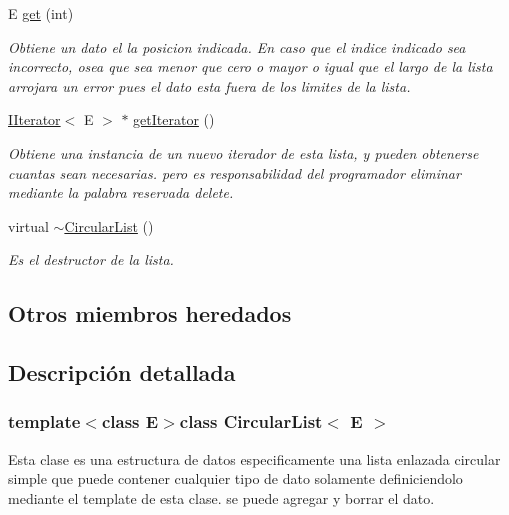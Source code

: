 \begin{DoxyCompactItemize}
E \hyperlink{classCircularList_ad6783339c7ff05841fc62f74f809644d}{get} (int)
\begin{DoxyCompactList}\small\item\em Obtiene un dato el la posicion indicada. En caso que el indice indicado sea incorrecto, osea que sea menor que cero o mayor o igual que el largo de la lista arrojara un error pues el dato esta fuera de los limites de la lista. \end{DoxyCompactList}\item 
\hyperlink{classIIterator}{I\-Iterator}$<$ E $>$ $\ast$ \hyperlink{classCircularList_a43e6cf1632001b3f409c6ce531529c6e}{get\-Iterator} ()
\begin{DoxyCompactList}\small\item\em Obtiene una instancia de un nuevo iterador de esta lista, y pueden obtenerse cuantas sean necesarias. pero es responsabilidad del programador eliminar mediante la palabra reservada delete. \end{DoxyCompactList}\item 
\hypertarget{classCircularList_aa65c9665b7d36a5e609752cad0a35dbb}{virtual \hyperlink{classCircularList_aa65c9665b7d36a5e609752cad0a35dbb}{$\sim$\-Circular\-List} ()}\label{classCircularList_aa65c9665b7d36a5e609752cad0a35dbb}

\begin{DoxyCompactList}\small\item\em Es el destructor de la lista. \end{DoxyCompactList}\end{DoxyCompactItemize}
\subsection*{Otros miembros heredados}


\subsection{Descripción detallada}
\subsubsection*{template$<$class E$>$class Circular\-List$<$ E $>$}

Esta clase es una estructura de datos especificamente una lista enlazada circular simple que puede contener cualquier tipo de dato solamente definiciendolo mediante el template de esta clase. se puede agregar y borrar el dato. 

